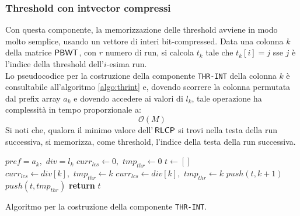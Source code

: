 \subsubsection{Threshold con intvector compressi}
Con questa componente, la memorizzazione delle threshold avviene in modo molto
semplice, 
usando un vettore di interi bit-compressed. Data una colonna $k$ della
matrice $\mbox{\rm {\sf PBWT}}$, con $r$ numero di run, si calcola $t_k$ tale che
$t_k[i]=j$ sse $j$ è l'indice della threshold dell'$i$-esima run.\\
Lo pseudocodice per la costruzione della componente
\texttt{THR-INT} della colonna $k$ è consultabile all'algoritmo
\ref{algo:thrint} 
e, dovendo scorrere la colonna permutata dal prefix array $a_k$ e dovendo
accedere ai valori di $l_k$, tale operazione ha complessità in tempo
proporzionale a:
\begin{equation}
  \label{eq:thrint}
  \mathcal{O}(M)
\end{equation}
Si noti che, qualora il minimo valore dell'$\,\mbox{\rm {\sf RLCP}}$ si trovi nella testa della
run successiva, si memorizza, come threshold, l'indice della testa della run
successiva.
\begin{algorithm}
  \begin{algorithmic}
    \Comment $pref=a_k,\,\,div=l_k$
    \State $curr_{lcs}\gets 0,\,\,tmp_{thr}\gets 0$
    \State $t\gets[]$
    \For {\textit{every} $k\in\left[0,\,\, M\right)$}
    \State $curr_{lcs}\gets div[k],\,\,tmp_{thr}\gets k$
    \EndIf
    \State $curr_{lcs}\gets div[k],\,\,tmp_{thr}\gets k$
    \EndIf
    \State $push(t, k+1)$
    \Else 
    \State $push(t, tmp_{thr})$
    \EndIf
    \EndIf
    \EndFor
    \State \textbf{return} $t$  
    \EndFunction
  \end{algorithmic}
  \caption{Algoritmo per la costruzione della componente \texttt{THR-INT}.}
  \label{algo:thrint}
\end{algorithm}
